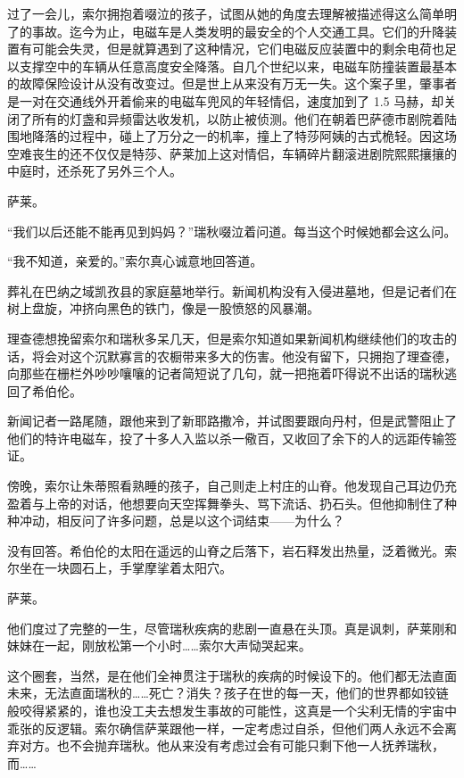 \documentclass[AutoFakeBold=true]{book}
\begin{document}
过了一会儿，索尔拥抱着啜泣的孩子，试图从她的角度去理解被描述得这么简单明了的事故。迄今为止，电磁车是人类发明的最安全的个人交通工具。它们的升降装置有可能会失灵，但是就算遇到了这种情况，它们电磁反应装置中的剩余电荷也足以支撑空中的车辆从任意高度安全降落。自几个世纪以来，电磁车防撞装置最基本的故障保险设计从没有改变过。但是世上从来没有万无一失。这个案子里，肇事者是一对在交通线外开着偷来的电磁车兜风的年轻情侣，速度加到了 1.5 马赫，却关闭了所有的灯盏和异频雷达收发机，以防止被侦测。他们在朝着巴萨德市剧院着陆围地降落的过程中，碰上了万分之一的机率，撞上了特莎阿姨的古式桅轻。因这场空难丧生的还不仅仅是特莎、萨莱加上这对情侣，车辆碎片翻滚进剧院熙熙攘攘的中庭时，还杀死了另外三个人。

{\kaishu 萨莱。}

``我们以后还能不能再见到妈妈？''瑞秋啜泣着问道。每当这个时候她都会这么问。

``我不知道，亲爱的。''索尔真心诚意地回答道。

\vspace*{1em}

葬礼在巴纳之域凯孜县的家庭墓地举行。新闻机构没有入侵进墓地，但是记者们在树上盘旋，冲挤向黑色的铁门，像是一股愤怒的风暴潮。

理查德想挽留索尔和瑞秋多呆几天，但是索尔知道如果新闻机构继续他们的攻击的话，将会对这个沉默寡言的农橱带来多大的伤害。他没有留下，只拥抱了理查德，向那些在栅栏外吵吵嚷嚷的记者简短说了几句，就一把拖着吓得说不出话的瑞秋逃回了希伯伦。

新闻记者一路尾随，跟他来到了新耶路撒冷，并试图要跟向丹村，但是武警阻止了他们的特许电磁车，投了十多人入监以杀一儆百，又收回了余下的人的远距传输签证。

\vspace*{1em}

傍晚，索尔让朱蒂照看熟睡的孩子，自己则走上村庄的山脊。他发现自己耳边仍充盈着与上帝的对话，他想要向天空挥舞拳头、骂下流话、扔石头。但他抑制住了种种冲动，相反问了许多问题，总是以这个词结束——为什么？

没有回答。希伯伦的太阳在遥远的山脊之后落下，岩石释发出热量，泛着微光。索尔坐在一块圆石上，手掌摩挲着太阳穴。

{\kaishu 萨莱。}

他们度过了完整的一生，尽管瑞秋疾病的悲剧一直悬在头顶。真是讽刺，萨莱刚和妹妹在一起，刚放松第一个小时……索尔大声恸哭起来。

这个圈套，当然，是在他们全神贯注于瑞秋的疾病的时候设下的。他们都无法直面未来，无法直面瑞秋的……死亡？消失？孩子在世的每一天，他们的世界都如铰链般咬得紧紧的，谁也没工夫去想发生事故的可能性，这真是一个尖利无情的宇宙中乖张的反逻辑。索尔确信萨莱跟他一样，一定考虑过自杀，但他们两人永远不会离弃对方。也不会抛弃瑞秋。他从来没有考虑过会有可能只剩下他一人抚养瑞秋，而……
\end{document}
